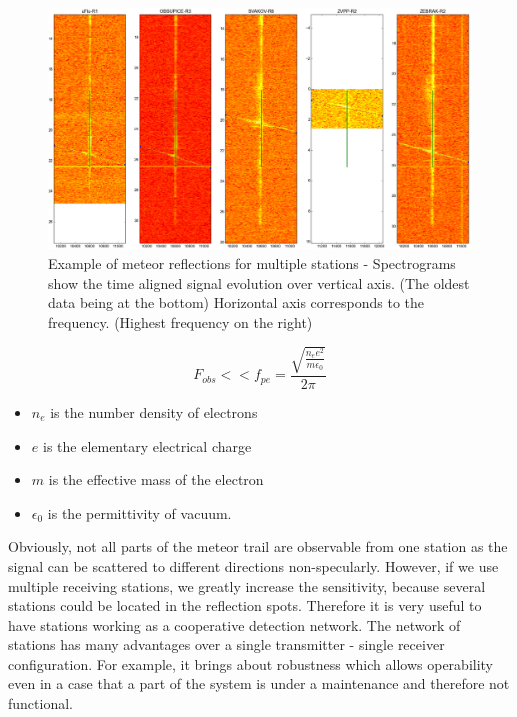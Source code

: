 \documentclass[twoside]{ctuthesis}
\theoremstyle{plain}
\theoremstyle{definition}
\theoremstyle{note}
\begin{document}
\begin{figure}
 \begin{center}
 \includegraphics[width=\textwidth]{./img/Raws_analyser.png}
 \caption{Example of meteor reflections for multiple stations - Spectrograms show the time aligned signal evolution over vertical axis. (The oldest data being at the bottom) Horizontal axis corresponds to the frequency. (Highest frequency on the right)}
  \label{fig:meteor_reflections} 
 \end{center}
\end{figure}

\begin{equation}
F_{obs} << f_{pe} =\frac{\sqrt{\frac{n_e e^2}{m \epsilon_0}}}{2 \pi}
\label{equ:plasma_frequency}
\end{equation}
\begin{itemize}
\item $n_e$ is the number density of electrons
\item $e$ is the elementary electrical charge
\item $m$ is the effective mass of the electron
\item $\epsilon_0$ is the permittivity of vacuum.
\end{itemize}

Obviously, not all parts of the meteor trail are observable from one station as the signal can be scattered to different directions non-specularly.
However, if we use multiple receiving stations, we greatly increase the sensitivity, because several stations could be located in the reflection spots. Therefore it is very useful to have stations working as a cooperative detection network.
The network of stations has many advantages over a single transmitter - single receiver configuration. For example, it brings about robustness which allows operability even in a case that a part of the system is under a maintenance and therefore not functional.
                   
\end{document}
